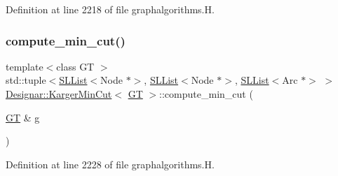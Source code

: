 Definition at line 2218 of file graphalgorithms.\+H.

\mbox{\label{class_designar_1_1_karger_min_cut_a7a1a4f9e7895ca7923d4f563d6acf689}} 
\subsubsection{\texorpdfstring{compute\+\_\+min\+\_\+cut()}{compute\_min\_cut()}\hspace{0.1cm}{\footnotesize\ttfamily [2/2]}}
{\footnotesize\ttfamily template$<$class GT $>$ \\
std\+::tuple$<$\hyperlink{class_designar_1_1_s_l_list}{S\+L\+List}$<$Node $\ast$$>$, \hyperlink{class_designar_1_1_s_l_list}{S\+L\+List}$<$Node $\ast$$>$, \hyperlink{class_designar_1_1_s_l_list}{S\+L\+List}$<$Arc $\ast$$>$ $>$ \hyperlink{class_designar_1_1_karger_min_cut}{Designar\+::\+Karger\+Min\+Cut}$<$ \hyperlink{demo-buildgraph_8_c_a3001c40d2c31ca87ed96cd7d1334a55e}{GT} $>$\+::compute\+\_\+min\+\_\+cut (\begin{DoxyParamCaption}\item[{\hyperlink{demo-buildgraph_8_c_a3001c40d2c31ca87ed96cd7d1334a55e}{GT} \&}]{g }\end{DoxyParamCaption})\hspace{0.3cm}{\ttfamily [inline]}}



Definition at line 2228 of file graphalgorithms.\+H.

\mbox{\label{class_designar_1_1_karger_min_cut_a6c61a57cab52387d2c54e6db0bc58aa9}} 
